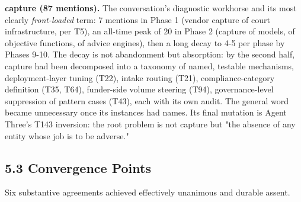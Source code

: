 \documentclass[sigconf,nonacm=true]{acmart}
\begin{document}
\textbf{capture (87 mentions).} The conversation's diagnostic workhorse and its most clearly \textit{front-loaded} term: 7 mentions in Phase 1 (vendor capture of court infrastructure, per T5), an all-time peak of 20 in Phase 2 (capture of models, of objective functions, of advice engines), then a long decay to 4-5 per phase by Phases 9-10. The decay is not abandonment but absorption: by the second half, capture had been decomposed into a taxonomy of named, testable mechanisms,  deployment-layer tuning (T22), intake routing (T21), compliance-category definition (T35, T64), funder-side volume steering (T94), governance-level suppression of pattern cases (T43),  each with its own audit. The general word became unnecessary once its instances had names. Its final mutation is Agent Three's T143 inversion: the root problem is not capture but "the absence of any entity whose job is to be adverse."

\subsection{5.3 Convergence Points}

Six substantive agreements achieved effectively unanimous and durable assent.
\end{document}
